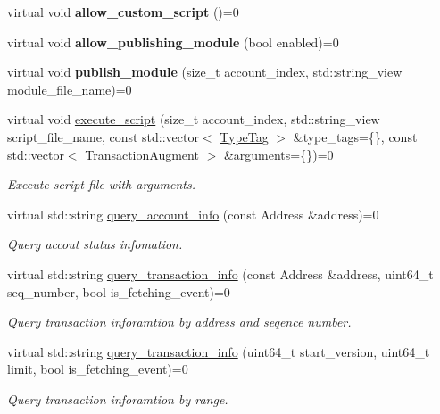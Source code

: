 \begin{DoxyCompactItemize}
\mbox{\label{classviolas_1_1_client_a83cf2d3e86e8cf0b1b44121022a04331}} 
virtual void {\bfseries allow\+\_\+custom\+\_\+script} ()=0
\item 
\mbox{\label{classviolas_1_1_client_a23218ce437ef2bb6e73ea19fb3cdd3e1}} 
virtual void {\bfseries allow\+\_\+publishing\+\_\+module} (bool enabled)=0
\item 
\mbox{\label{classviolas_1_1_client_a108e8d44dfeec170bae2e87cf6135e9e}} 
virtual void {\bfseries publish\+\_\+module} (size\+\_\+t account\+\_\+index, std\+::string\+\_\+view module\+\_\+file\+\_\+name)=0
\item 
virtual void \hyperlink{classviolas_1_1_client_aba697ca0b8ab6aba82934ff3f04c25f1}{execute\+\_\+script} (size\+\_\+t account\+\_\+index, std\+::string\+\_\+view script\+\_\+file\+\_\+name, const std\+::vector$<$ \hyperlink{structviolas_1_1_type_tag}{Type\+Tag} $>$ \&type\+\_\+tags=\{\}, const std\+::vector$<$ Transaction\+Augment $>$ \&arguments=\{\})=0
\begin{DoxyCompactList}\small\item\em Execute script file with arguments. \end{DoxyCompactList}\item 
virtual std\+::string \hyperlink{classviolas_1_1_client_a7f4a69e73d97ed34187990fdcd9b38d1}{query\+\_\+account\+\_\+info} (const Address \&address)=0
\begin{DoxyCompactList}\small\item\em Query accout status infomation. \end{DoxyCompactList}\item 
virtual std\+::string \hyperlink{classviolas_1_1_client_aaad474fa0f89c6bbef125d12749a7c70}{query\+\_\+transaction\+\_\+info} (const Address \&address, uint64\+\_\+t seq\+\_\+number, bool is\+\_\+fetching\+\_\+event)=0
\begin{DoxyCompactList}\small\item\em Query transaction inforamtion by address and seqence number. \end{DoxyCompactList}\item 
virtual std\+::string \hyperlink{classviolas_1_1_client_aa6a3d75fbd4b3bf3c7fc3282c43398e1}{query\+\_\+transaction\+\_\+info} (uint64\+\_\+t start\+\_\+version, uint64\+\_\+t limit, bool is\+\_\+fetching\+\_\+event)=0
\begin{DoxyCompactList}\small\item\em Query transaction inforamtion by range. \end{DoxyCompactList}\item 

\end{DoxyCompactItemize}
